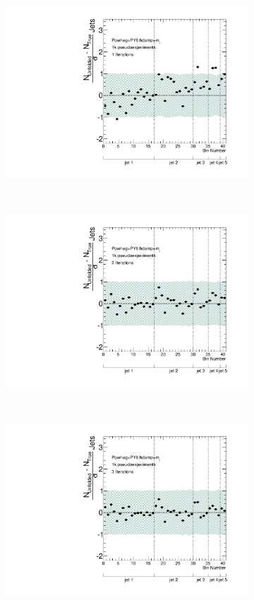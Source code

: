 \begin{figure}
\begin{subfigure}[]{0.5\textwidth}
\includegraphics[width=\textwidth]{fig/Stress/110404atlfast/Pull1Iterations.pdf}
\end{subfigure}
~
\begin{subfigure}[]{0.5\textwidth}
\includegraphics[width=\textwidth]{fig/Stress/110404atlfast/Pull2Iterations.pdf}
\end{subfigure}
\\
\begin{subfigure}[]{0.5\textwidth}
\includegraphics[width=\textwidth]{fig/Stress/110404atlfast/Pull3Iterations.pdf}

\end{subfigure}
\end{figure}
